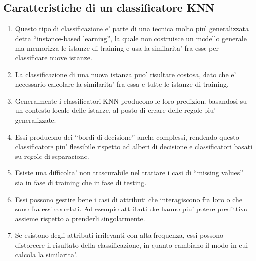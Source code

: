   \subsection{Caratteristiche di un classificatore KNN}
    \begin{enumerate}
      \item {
        Questo tipo di classificazione e' parte di una tecnica molto piu' generalizzata detta ``instance-based learning'', la quale non costruisce un modello generale ma memorizza le istanze di training e usa la similarita' fra esse per classificare nuove istanze.
      }

      \item {
        La classificazione di una nuova istanza puo' risultare costosa, dato che e' necessario calcolare la similarita' fra essa e tutte le istanze di training.
      }

      \item {
        Generalmente i classificatori KNN producono le loro predizioni basandosi su un contesto locale delle istanze, al posto di creare delle regole piu' generalizzate.
      }

      \item {
        Essi producono dei ``bordi di decisione'' anche complessi, rendendo questo classificatore piu' flessibile rispetto ad alberi di decisione e classificatori basati su regole di separazione.
      }

      \item {
        Esiste una difficolta' non trascurabile nel trattare i casi di ``missing values'' sia in fase di training che in fase di testing.
      }

      \item {
        Essi possono gestire bene i casi di attributi che interagiscono fra loro o che sono fra essi correlati. Ad esempio attributi che hanno piu' potere predittivo assieme rispetto a prenderli singolarmente.
      }

      \item {
        Se esistono degli attributi irrilevanti con alta frequenza, essi possono distorcere il risultato della classificazione, in quanto cambiano il modo in cui calcola la similarita'.
      }
    \end{enumerate}

